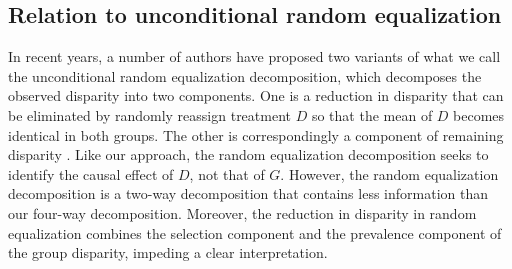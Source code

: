 \documentclass[12pt,a4paper]{article}
\begin{document}
\subsection{Relation to unconditional random equalization}
In recent years, a number of authors have proposed two variants of what we call the unconditional random equalization decomposition, which decomposes the observed disparity into two components. One is a reduction in disparity that can be eliminated by randomly reassign treatment $D$ so that the mean of $D$ becomes identical in both groups. The other is correspondingly a component of remaining disparity \citep{vanderweele_causal_2014, jackson_decomposition_2018, sudharsanan_educational_2021, lundberg_gap-closing_2022}. Like our approach, the random equalization decomposition seeks to identify the causal effect of $D$, not that of $G$. However, the random equalization decomposition is a two-way decomposition that contains less information than our four-way decomposition. Moreover, the reduction in disparity in random equalization combines the selection component and the prevalence component of the group disparity, impeding a clear interpretation.

\end{document}
